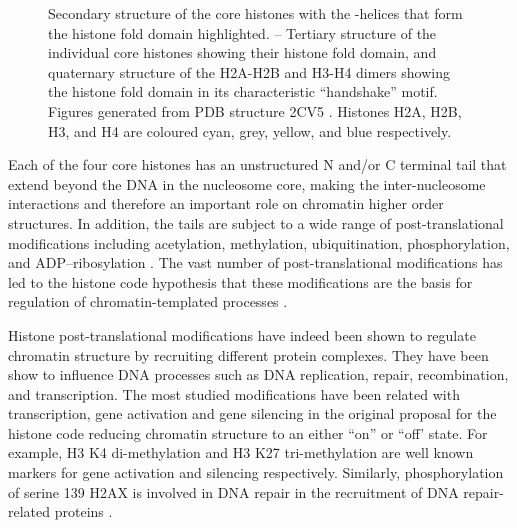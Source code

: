 \begin{figure}
                     {
                       Secondary structure of the core histones with
                       the \textalpha-helices that form the histone
                       fold domain highlighted.
                       --%
                       Tertiary structure of the individual core
                       histones showing their histone fold domain, and
                       quaternary structure of the H2A-H2B and H3-H4
                       dimers showing the histone fold domain in its
                       characteristic ``handshake'' motif.  Figures
                       generated from PDB structure 2CV5
                       \citep{tsunaka2005-2cv5}.  Histones H2A, H2B,
                       H3, and H4 are coloured cyan, grey, yellow, and
                       blue respectively.}
      \end{figure}


      Each of the four core histones has an unstructured N and/or C
      terminal tail that extend beyond the DNA in the nucleosome core,
      making the inter-nucleosome interactions and therefore an important
      role on chromatin higher order structures.
      In addition, the tails are subject to a wide range of
      post-translational modifications
      including acetylation, methylation, ubiquitination, phosphorylation,
      and ADP--ribosylation \citep{bannister2011ptm-review}.
      The vast number of post-translational modifications has led to the
      histone code hypothesis that these modifications are the basis for
      regulation of chromatin-templated processes \citep{jenuwein200histone-code}.


      Histone post-translational modifications have indeed been shown to
      regulate chromatin structure
      by recruiting different protein complexes.
      They have been show to influence
      DNA processes such as DNA replication, repair, recombination,
      and transcription.
      The most studied modifications have been related with transcription,
      gene activation and gene silencing in
      the original proposal for the histone code \citep{jenuwein200histone-code}
      reducing chromatin structure to an either ``on'' or ``off' state.
      For example,
      H3 K4 di-methylation and H3 K27 tri-methylation are well known
      markers for gene activation and silencing respectively.
      Similarly,
      phosphorylation of serine 139 H2AX is involved in DNA repair
      in the recruitment of DNA repair-related proteins .

